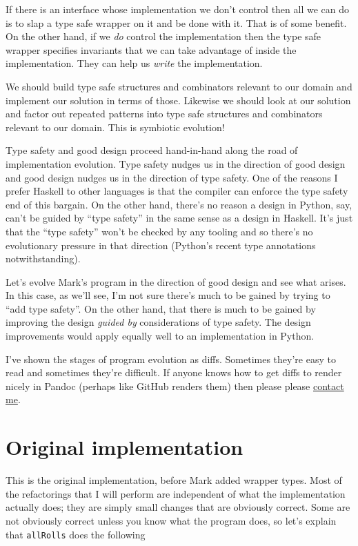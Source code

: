 If there is an interface whose implementation we don't control then all we can do is to slap a type safe wrapper on it and be done with it. That is of some benefit. On the other hand, if we \textit{do} control the implementation then the type safe wrapper specifies invariants that we can take advantage of inside the implementation. They can help us \textit{write} the implementation.

We should build type safe structures and combinators relevant to our domain and implement our solution in terms of those. Likewise we should look at our solution and factor out repeated patterns into type safe structures and combinators relevant to our domain. This is symbiotic evolution!

Type safety and good design proceed hand-in-hand along the road of implementation evolution. Type safety nudges us in the direction of good design and good design nudges us in the direction of type safety. One of the reasons I prefer Haskell to other languages is that the compiler can enforce the type safety end of this bargain. On the other hand, there's no reason a design in Python, say, can't be guided by ``type safety'' in the same sense as a design in Haskell. It's just that the ``type safety'' won't be checked by any tooling and so there's no evolutionary pressure in that direction (Python's recent type annotations notwithstanding).

Let's evolve Mark's program in the direction of good design and see what arises. In this case, as we'll see, I'm not sure there's much to be gained by trying to ``add type safety''. On the other hand, that there is much to be gained by improving the design \textit{guided by} considerations of type safety. The design improvements would apply equally well to an implementation in Python.

I've shown the stages of program evolution as diffs. Sometimes they're easy to read and sometimes they're difficult. If anyone knows how to get diffs to render nicely in Pandoc (perhaps like GitHub renders them) then please please \href{http://web.jaguarpaw.co.uk/~tom/contact/}{contact me}.

\section{Original implementation}

This is the original implementation, before Mark added wrapper types. Most of the refactorings that I will perform are independent of what the implementation actually does; they are simply small changes that are obviously correct. Some are not obviously correct unless you know what the program does, so let's explain that \texttt{allRolls} does the following

